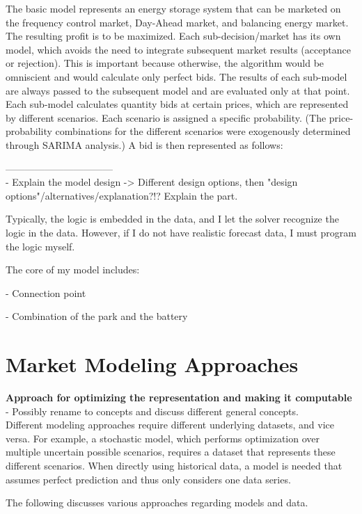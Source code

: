 The basic model represents an energy storage system that can be marketed on the frequency control market, Day-Ahead market, and balancing energy market.
The resulting profit is to be maximized. Each sub-decision/market has its own model, which avoids the need to integrate subsequent market results (acceptance or rejection). This is important because otherwise, the algorithm would be omniscient and would calculate only perfect bids. The results of each sub-model are always passed to the subsequent model and are evaluated only at that point. Each sub-model calculates quantity bids at certain prices, which are represented by different scenarios. Each scenario is assigned a specific probability.
(The price-probability combinations for the different scenarios were exogenously determined through SARIMA analysis.)
A bid is then represented as follows:

---------------------------------\\

- Explain the model design
-> Different design options, then "design options"/alternatives/explanation?!? Explain the part.

Typically, the logic is embedded in the data, and I let the solver recognize the logic in the data.
However, if I do not have realistic forecast data, I must program the logic myself.

The core of my model includes:

- Connection point

- Combination of the park and the battery

\section{Market Modeling Approaches}
\textbf{Approach for optimizing the representation and making it computable} \\

- Possibly rename to concepts and discuss different general concepts. \\

Different modeling approaches require different underlying datasets, and vice versa.
For example, a stochastic model, which performs optimization over multiple uncertain possible scenarios, requires a dataset that represents these different scenarios.
When directly using historical data, a model is needed that assumes perfect prediction and thus only considers one data series.

The following discusses various approaches regarding models and data.

